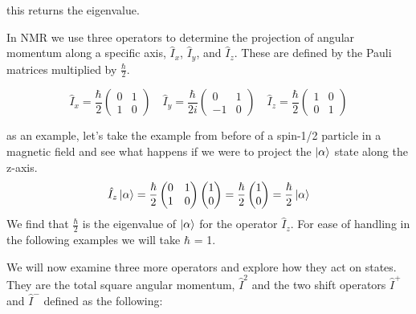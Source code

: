 this returns the eigenvalue.

In NMR we use three operators to determine the projection of angular momentum along a specific axis, $\hat{I}_x$, $\hat{I}_y$, and $\hat{I}_z$. These are defined by the Pauli matrices multiplied by $\frac{\hbar}{2}$.

\begin{equation}
  \hat{I}_x=\frac{\hbar}{2}\begin{pmatrix}
    0 & 1\\
    1 & 0
\end{pmatrix}\quad
\hat{I}_y=\frac{\hbar}{2i}\begin{pmatrix}
  0 & 1\\
  -1 & 0
\end{pmatrix}\quad
\hat{I}_z=\frac{\hbar}{2}\begin{pmatrix}
  1 & 0\\
  0 & 1
\end{pmatrix}
\end{equation}

as an example, let's take the example from before of a spin-1/2 particle in a magnetic field
and see what happens if we were to project the $\ket{\alpha}$ state along the z-axis.
\begin{equation}\label{eqn:operators}
  \hat{I}_z\ket{\alpha} = \frac{\hbar}{2}\begin{pmatrix}
    0 & 1\\
    1 & 0
\end{pmatrix}
\begin{pmatrix}
  1\\
  0
\end{pmatrix} = \frac{\hbar}{2}\begin{pmatrix}
  1\\
  0
\end{pmatrix} = \frac{\hbar}{2}\ket{\alpha}
\end{equation}
We find that $\frac{\hbar}{2}$ is the eigenvalue of $\ket{\alpha}$ for the operator $\hat{I}_z$. For ease of handling in the following examples we will take $\hbar$ = 1.

We will now examine three more operators and explore how they act on states. They are the total square angular momentum, $\hat{I}^2$ and the two shift operators $\hat{I}^+$ and $\hat{I}^-$ defined as the following:

